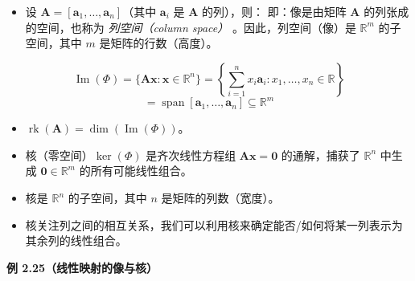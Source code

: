 \begin{itemize}
\item 设 $ \boldsymbol{A} = [\boldsymbol{a}_1, \ldots, \boldsymbol{a}_n] $（其中 $ \boldsymbol{a}_i $ 是 $ \boldsymbol{A} $ 的列），则： 即：像是由矩阵 $ \boldsymbol{A} $ 的列张成的空间，也称为 \emph{列空间（column space）} 。因此，列空间（像）是 $ \mathbb{R}^m $ 的子空间，其中 $ m $ 是矩阵的行数（高度）。
\end{itemize}
\begin{equation}
\operatorname{Im}(\Phi) = \{\boldsymbol{A} \boldsymbol{x} : \boldsymbol{x} \in \mathbb{R}^n\} = \left\{ \sum_{i=1}^n x_i \boldsymbol{a}_i : x_1, \ldots, x_n \in \mathbb{R} \right\}
\tag{2.124a}\label{eq:2-124a}
\end{equation}
\begin{equation}
= \operatorname{span}[\boldsymbol{a}_1, \ldots, \boldsymbol{a}_n] \subseteq \mathbb{R}^m
\tag{2.124b}\label{eq:2-124b}
\end{equation}
\begin{itemize}
\item $ \operatorname{rk}(\boldsymbol{A}) = \operatorname{dim}(\operatorname{Im}(\Phi)) $。
\item 核（零空间）$ \operatorname{ker}(\Phi) $ 是齐次线性方程组 $ \boldsymbol{A} \boldsymbol{x} = \boldsymbol{0} $ 的通解，捕获了 $ \mathbb{R}^n $ 中生成 $ \boldsymbol{0} \in \mathbb{R}^m $ 的所有可能线性组合。
\item 核是 $ \mathbb{R}^n $ 的子空间，其中 $ n $ 是矩阵的列数（宽度）。
\item 核关注列之间的相互关系，我们可以利用核来确定能否/如何将某一列表示为其余列的线性组合。
\end{itemize}

\begin{notebox}
\textbf{例 2.25（线性映射的像与核）}
\end{notebox}

